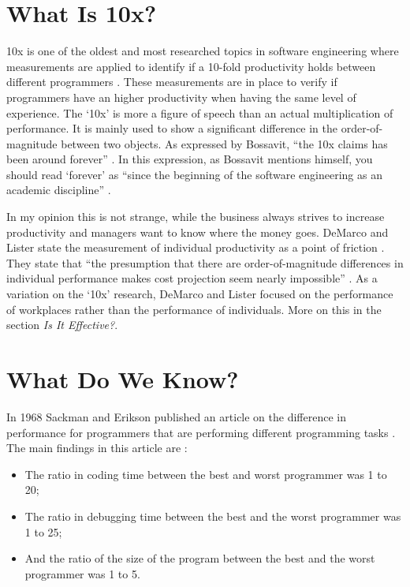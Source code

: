 \section*{What Is 10x?}

10x is one of the oldest and most researched topics in software engineering where measurements are applied to identify if a 10-fold productivity holds between different programmers \autocite[567]{MAKING_SOFTWARE}.
These measurements are in place to verify if programmers have an higher productivity when having the same level of experience.
The `10x' is more a figure of speech than an actual multiplication of performance.
It is mainly used to show a significant difference in the order-of-magnitude between two objects.
As expressed by Bossavit, ``the 10x claims has been around forever'' \autocite[37]{bossavit2013leprechauns}.
In this expression, as Bossavit mentions himself, you should read `forever' as ``since the beginning of the software engineering as an academic discipline'' \autocite[38-39]{bossavit2013leprechauns}.

In my opinion this is not strange, while the business always strives to increase productivity and managers want to know where the money goes.
DeMarco and Lister state the measurement of individual productivity as a point of friction \autocite[268]{demarco1985programmer}.
They state that ``the presumption that there are order-of-magnitude differences in individual performance makes cost projection seem nearly impossible'' \autocite[268]{demarco1985programmer}.
As a variation on the `10x' research, DeMarco and Lister focused on the performance of workplaces rather than the performance of individuals.
More on this in the section \textit{Is It Effective?}.

\section*{What Do We Know?}

In 1968 Sackman and Erikson published an article on the difference in performance for programmers that are performing different programming tasks \autocite{sackman1968exploratory}.
The main findings in this article are \autocite{sackman1968exploratory}\autocite[567]{MAKING_SOFTWARE}:
\begin{itemize}[noitemsep]
\item The ratio in coding time between the best and worst programmer was 1 to 20;
\item The ratio in debugging time between the best and the worst programmer was 1 to 25;
\item And the ratio of the size of the program between the best and the worst programmer was 1 to 5.
\end{itemize}

